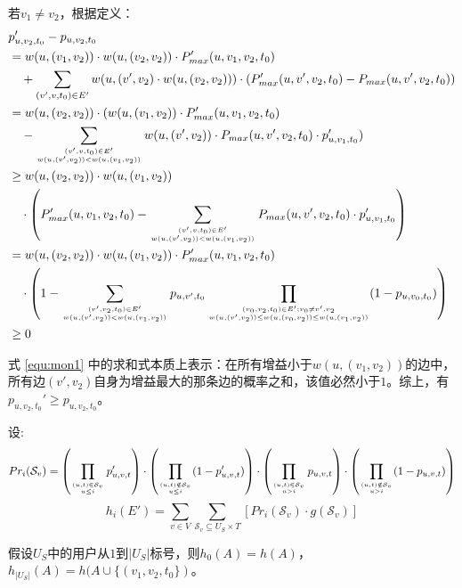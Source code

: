 若$v_1 \ne v_2$，根据定义：
\begin{align}
\small
    &p_{u,v_2,t_0}'-p_{u,v_2,t_0}\\
    &= w(u,(v_1,v_2))\cdot w(u,(v_2,v_2)) \cdot P_{max}'(u,v_1,v_2,t_0) \nonumber \\
    &\quad + \sum_{(v',v,t_0)\in E'}w(u,(v',v_2)\cdot w(u,(v_2,v_2))) \cdot(P_{max}'(u,v',v_2,t_0)-P_{max}(u,v',v_2,t_0)) \\ 
    &= w(u,(v_2,v_2)) \cdot (w(u,(v_1,v_2)) \cdot P_{max}'(u,v_1,v_2,t_0) \nonumber \\ &\quad -\sum_{(v',v,t_0)\in E' \atop w(u,(v',v_2))<w(u,(v_1,v_2))} w(u,(v',v_2))\cdot P_{max}(u,v',v_2,t_0)\cdot p_{u,v_1,t_0}' ) \\ 
    &\ge w(u,(v_2,v_2))\cdot w(u,(v_1,v_2)) \nonumber \\ &\quad \cdot  \left(P_{max}'(u,v_1,v_2,t_0)-\sum_{(v',v,t_0)\in E'\atop w(u,(v',v_2))<w(u,(v_1,v_2))}P_{max}(u,v',v_2,t_0)\cdot p_{u,v_1,t_0}'\right) \\ 
    &= w(u,(v_2,v_2))\cdot w(u,(v_1,v_2)) \cdot P_{max}'(u,v_1,v_2,t_0) \nonumber \\&\quad  \cdot \left(1-\sum_{(v',v_2,t_0)\in E' \atop w(u,(v',v_2))<w(u,(v_1,v_2))}p_{u,v',t_0}\prod_{(v_0,v_2,t_0)\in E' ; v_0 \ne v',v_2 \atop w(u,(v',v_2))\le w(u,(v_0,v_2)) \le w(u,(v_1,v_2))}(1-p_{u,v_0,t_0})\right)\label{equ:mon1} \\
    &\ge 0
\end{align}

式 \ref{equ:mon1} 中的求和式本质上表示：在所有增益小于$w(u,(v_1,v_2))$的边中，所有边$(v',v_2)$自身为增益最大的那条边的概率之和，该值必然小于$1$。综上，有$p_{u,v_2,t_0}'\ge p_{u,v_2,t_0}$。

设:
\begin{equation}
Pr_i(\mathcal{S}_v) = \left(\prod_{(u,t)\in \mathcal{S}_v \atop u \le i}p_{u,v,t}'\right)\cdot \left(\prod_{(u,t) \notin \mathcal{S}_v \atop u\le i} (1-p_{u,v,t}')\right)\cdot \left(\prod_{(u,t)\in \mathcal{S}_v \atop u > i}p_{u,v,t}\right)\cdot \left(\prod_{(u,t) \notin \mathcal{S}_v \atop u > i} (1-p_{u,v,t})\right)
\end{equation}
\begin{equation}
h_i(E')= \sum_{v\in V} \sum_{\mathcal{S}_v \subseteq U_S \times T} \left[Pr_i(\mathcal{S}_v)\cdot g(\mathcal{S}_v)\right]
\end{equation}

假设$U_S$中的用户从$1$到$|U_S|$标号，则$h_0(A)=h(A)$，$h_{|U_S|}(A)=h(A\cup\{(v_1,v_2,t_0\})$。

